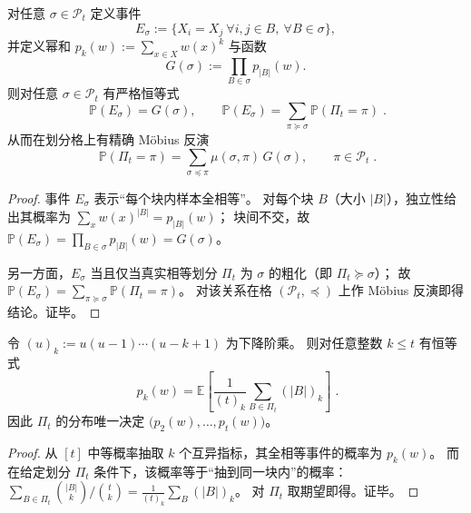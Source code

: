 \begin{theorem}[事件--划分 Möbius 反演]\label{thm:pom-partition-mobius-event-inversion}
对任意 \(\sigma\in\mathcal{P}_t\) 定义事件
\[
E_\sigma:=\{X_i=X_j\ \forall i,j\in B,\ \forall B\in\sigma\},
\]
并定义幂和
\(
p_k(w):=\sum_{x\in X}w(x)^k
\)
与函数
\[
G(\sigma):=\prod_{B\in\sigma}p_{|B|}(w).
\]
则对任意 \(\sigma\in\mathcal{P}_t\) 有严格恒等式
\[
\boxed{\;
\mathbb{P}(E_\sigma)=G(\sigma),\qquad
\mathbb{P}(E_\sigma)=\sum_{\pi\succeq\sigma}\mathbb{P}(\Pi_t=\pi)\; }.
\]
从而在划分格上有精确 Möbius 反演
\[
\boxed{\;
\mathbb{P}(\Pi_t=\pi)=\sum_{\sigma\preceq\pi}\mu(\sigma,\pi)\,G(\sigma),\qquad \pi\in\mathcal{P}_t\; }.
\]
\end{theorem}
\begin{proof}
事件 \(E_\sigma\) 表示“每个块内样本全相等”。
对每个块 \(B\)（大小 \(|B|\)），独立性给出其概率为 \(\sum_{x}w(x)^{|B|}=p_{|B|}(w)\)；
块间不交，故 \(\mathbb{P}(E_\sigma)=\prod_{B\in\sigma}p_{|B|}(w)=G(\sigma)\)。
\par
另一方面，\(E_\sigma\) 当且仅当真实相等划分 \(\Pi_t\) 为 \(\sigma\) 的粗化（即 \(\Pi_t\succeq\sigma\)）；
故 \(\mathbb{P}(E_\sigma)=\sum_{\pi\succeq\sigma}\mathbb{P}(\Pi_t=\pi)\)。
对该关系在格 \((\mathcal{P}_t,\preceq)\) 上作 Möbius 反演即得结论。证毕。
\end{proof}

\begin{corollary}[由相等模式显式提取幂和]\label{cor:pom-partition-extract-power-sums}
令 \((u)_k:=u(u-1)\cdots(u-k+1)\) 为下降阶乘。
则对任意整数 \(k\le t\) 有恒等式
\[
\boxed{\;
p_k(w)=\mathbb{E}\left[\frac{1}{(t)_k}\sum_{B\in\Pi_t}(|B|)_k\right]\; }.
\]
因此 \(\Pi_t\) 的分布唯一决定 \(\bigl(p_2(w),\dots,p_t(w)\bigr)\)。
\end{corollary}
\begin{proof}
从 \([t]\) 中等概率抽取 \(k\) 个互异指标，其全相等事件的概率为 \(p_k(w)\)。
而在给定划分 \(\Pi_t\) 条件下，该概率等于“抽到同一块内”的概率：
\(
\sum_{B\in\Pi_t}\binom{|B|}{k}/\binom{t}{k}
=\frac{1}{(t)_k}\sum_{B}(|B|)_k
\)。
对 \(\Pi_t\) 取期望即得。证毕。
\end{proof}

